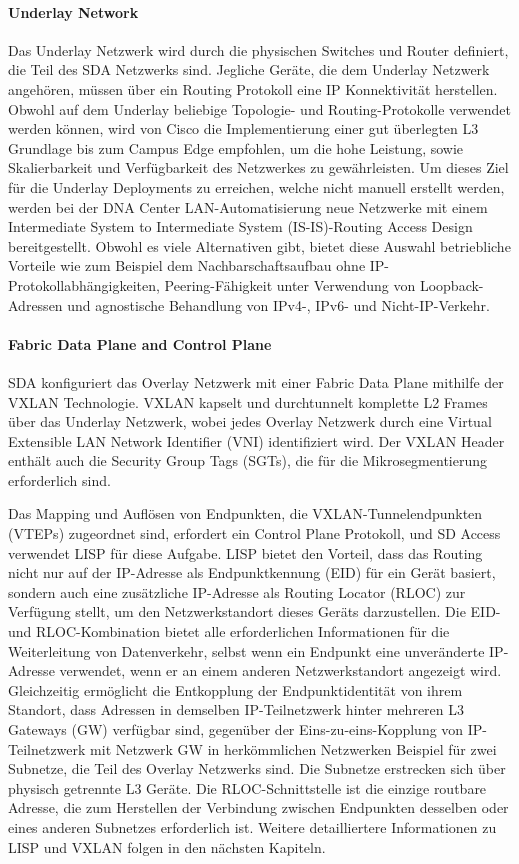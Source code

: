 \paragraph{Underlay Network}
Das Underlay Netzwerk wird durch die physischen Switches und Router definiert, die Teil des SDA Netzwerks sind. Jegliche Geräte, die dem Underlay Netzwerk angehören, müssen über ein Routing Protokoll eine IP Konnektivität herstellen. Obwohl auf dem Underlay beliebige Topologie- und Routing-Protokolle verwendet werden können, wird von Cisco die Implementierung einer gut überlegten L3 Grundlage bis zum Campus Edge empfohlen, um die hohe Leistung, sowie Skalierbarkeit und Verfügbarkeit des Netzwerkes zu gewährleisten. 
Um dieses Ziel für die Underlay Deployments zu erreichen, welche nicht manuell erstellt werden, werden bei der DNA Center LAN-Automatisierung neue Netzwerke mit einem Intermediate System to Intermediate System (IS-IS)-Routing Access Design bereitgestellt. Obwohl es viele Alternativen gibt, bietet diese Auswahl betriebliche Vorteile wie zum Beispiel dem Nachbarschaftsaufbau ohne IP-Protokollabhängigkeiten, Peering-Fähigkeit unter Verwendung von Loopback-Adressen und agnostische Behandlung von IPv4-, IPv6- und Nicht-IP-Verkehr. \cite{sda-designguide}

\paragraph{Fabric Data Plane and Control Plane}
SDA konfiguriert das Overlay Netzwerk mit einer Fabric Data Plane mithilfe der VXLAN Technologie. VXLAN kapselt und durchtunnelt komplette L2 Frames über das Underlay Netzwerk, wobei jedes Overlay Netzwerk durch eine Virtual Extensible LAN Network Identifier (VNI) identifiziert wird. Der VXLAN Header enthält auch die Security Group Tags (SGTs), die für die Mikrosegmentierung erforderlich sind.

Das Mapping und Auflösen von Endpunkten, die VXLAN-Tunnelendpunkten (VTEPs) zugeordnet sind, erfordert ein Control Plane Protokoll, und SD Access verwendet LISP für diese Aufgabe. LISP bietet den Vorteil, dass das Routing nicht nur auf der IP-Adresse als Endpunktkennung (EID) für ein Gerät basiert, sondern auch eine zusätzliche IP-Adresse als Routing Locator (RLOC) zur Verfügung stellt, um den Netzwerkstandort dieses Geräts darzustellen. Die EID- und RLOC-Kombination bietet alle erforderlichen Informationen für die Weiterleitung von Datenverkehr, selbst wenn ein Endpunkt eine unveränderte IP-Adresse verwendet, wenn er an einem anderen Netzwerkstandort angezeigt wird. Gleichzeitig ermöglicht die Entkopplung der Endpunktidentität von ihrem Standort, dass Adressen in demselben IP-Teilnetzwerk hinter mehreren L3 Gateways (GW) verfügbar sind, gegenüber der Eins-zu-eins-Kopplung von IP-Teilnetzwerk mit Netzwerk GW in herkömmlichen Netzwerken Beispiel für zwei Subnetze, die Teil des Overlay Netzwerks sind. Die Subnetze erstrecken sich über physisch getrennte L3 Geräte. Die RLOC-Schnittstelle ist die einzige routbare Adresse, die zum Herstellen der Verbindung zwischen Endpunkten desselben oder eines anderen Subnetzes erforderlich ist. Weitere detailliertere Informationen zu LISP und VXLAN folgen in den nächsten Kapiteln. \cite{sda-designguide} \\



